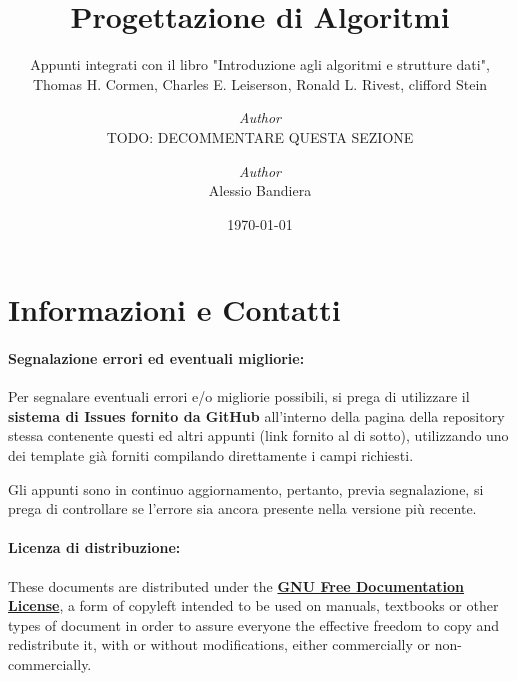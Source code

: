 \documentclass[a4paper, 12pt]{report}
\institute{\curlyquotes{\hspace{0.25mm}Sapienza} Università di Roma}
\title{Progettazione di Algoritmi}
\subtitle{Appunti integrati con il libro "Introduzione agli algoritmi e strutture dati", Thomas H. Cormen, Charles E. Leiserson, Ronald L. Rivest, clifford Stein}
\author{\textit{Author}\\TODO: DECOMMENTARE QUESTA SEZIONE}
\author{\textit{Author}\\Alessio Bandiera}
\date{\today}
\begin{document}
    \maketitle

    {
        \hypersetup{allcolors=black}

        \romantableofcontents
    }

    \chapter*{Informazioni e Contatti}      %

    \subsubsection{Segnalazione errori ed eventuali migliorie:}
    
    Per segnalare eventuali errori e/o migliorie possibili, si prega di utilizzare il \textbf{sistema di Issues fornito da GitHub} all'interno della pagina della repository stessa contenente questi ed altri appunti (link fornito al di sotto), utilizzando uno dei template già forniti compilando direttamente i campi richiesti.

    Gli appunti sono in continuo aggiornamento, pertanto, previa segnalazione, si prega di controllare se l'errore sia ancora presente nella versione più recente.

    \quad

    \subsubsection{Licenza di distribuzione:}
    
    These documents are distributed under the \textbf{\href{https://www.gnu.org/licenses/fdl-1.3.txt}{GNU Free Documentation License}}, a form of copyleft intended to be used on manuals, textbooks or other types of document in order to assure everyone the effective freedom to copy and redistribute it, with or without modifications, either commercially or non-commercially.
    
\end{document}
